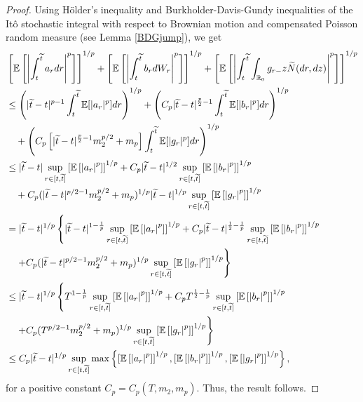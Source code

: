 \documentclass[11pt]{article}
\theoremstyle{theorem}
\theoremstyle{definition}
\newcommand{\bR}{\mathbb{R}}
\newcommand{\1}{{\bf 1}}
\begin{document}
 \begin{proof} 
 Using H\"older's inequality and Burkholder-Davis-Gundy inequalities of the It\^o stochastic integral with respect to Brownian motion and compensated Poisson random measure (see Lemma \ref{BDGjump}), we get
\begin{align*} 
 &\left[\mathbb{E} \left[\left| \int_t^{\widetilde{t}} a_r dr \right|^p \right]\right]^{1/p} + \left[\mathbb{E} \left[\left| \int_t^{\widetilde{t}} b_r dW_r \right|^p \right]\right]^{1/p} + \left[\mathbb{E}\left[ \left| \int_t^{\widetilde{t}} \int _{\bR_0} g_{r-} z \widetilde{N}(dr, dz) \right|^p \right]\right]^{1/p} \notag  \\
 & \leq \left(|\widetilde{t} -t|^{p-1} \int_t^{\widetilde{t}} \mathbb{E} [|a_r|^p] dr\right)^{1/p}  + \left( C_p |\widetilde{t} -t|^{\frac{p}{2}-1} \int_t^{\widetilde{t}} \mathbb{E} [|b_r|^p] dr\right)^{1/p}  \notag  \\
 & \quad + \left( C_p \left[|\widetilde{t} -t|^{\frac{p}{2}-1} m_2^{p/2} +m_p \right] \int_t^{\widetilde{t}} \mathbb{E} [|g_r|^p] dr\right)^{1/p}  \notag  \\
 & \leq |\widetilde{t} -t|\sup_{r\in [t, \widetilde{t}]} \left [\mathbb{E} \left[\left| a_r \right|^p\right]\right]^{1/p} + C_p|\widetilde{t} -t|^{1/2} \sup_{r\in [t, \widetilde{t}]} \left [\mathbb{E} \left[\left| b_r \right|^p\right]\right]^{1/p} \notag\\
 & \quad + C_p (|\widetilde{t}-t|^{p/2 -1} m_2^{p/2} + m_p)^{1/p}|\widetilde{t} -t|^{1/p} \sup_{r\in [t, \widetilde{t}]} \left [\mathbb{E} \left[\left| g_r \right|^p\right]\right]^{1/p} \notag \\
 & = |\widetilde{t} -t|^{1/p} \left\{ |\widetilde{t} -t|^{1-\frac{1}{p}} \sup_{r\in [t, \widetilde{t}]} \left [\mathbb{E} \left[\left| a_r \right|^p\right]\right]^{1/p} + C_p|\widetilde{t} -t|^{\frac{1}{2}-\frac{1}{p}} \sup_{r\in [t, \widetilde{t}]} \left [\mathbb{E} \left[\left| b_r \right|^p\right]\right]^{1/p} \right.\notag\\
 & \quad \left. + C_p (|\widetilde{t}-t|^{p/2 -1} m_2^{p/2} + m_p)^{1/p} \sup_{r\in [t, \widetilde{t}]} \left [\mathbb{E} \left[\left| g_r \right|^p\right]\right]^{1/p}\right\} \notag\\
& \leq |\widetilde{t} -t|^{1/p} \left\{ T^{1-\frac{1}{p}} \sup_{r\in [t, \widetilde{t}]} \left [\mathbb{E} \left[\left| a_r \right|^p\right]\right]^{1/p} + C_p T^{\frac{1}{2}-\frac{1}{p}} \sup_{r\in [t, \widetilde{t}]} \left [\mathbb{E} \left[\left| b_r \right|^p\right]\right]^{1/p} \right.\notag\\
 & \quad \left. + C_p (T^{p/2 -1} m_2^{p/2} + m_p)^{1/p} \sup_{r\in [t, \widetilde{t}]} \left [\mathbb{E} \left[\left| g_r \right|^p\right]\right]^{1/p}\right\} \notag\\
 & \leq C_p |\widetilde{t} -t|^{1/p} \sup_{r\in [t, \widetilde{t}]} \max \left\{ \left [\mathbb{E} \left[\left| a_r \right|^p\right]\right]^{1/p}, \left [\mathbb{E} \left[\left| b_r \right|^p\right]\right]^{1/p}, \left [\mathbb{E} \left[\left|g_r \right|^p\right]\right]^{1/p} \right\},
\end{align*}
for a positive constant $C_p=C_p(T, m_2, m_p)$. Thus, the result follows.
\end{proof}
\end{document}
